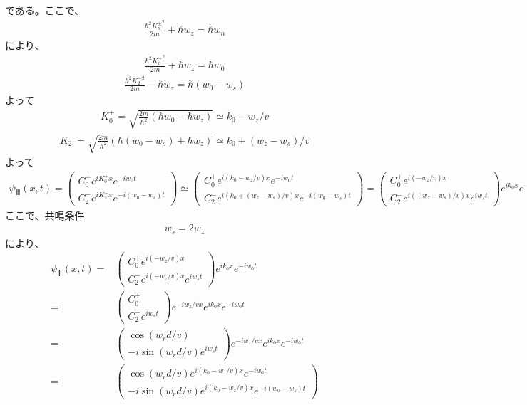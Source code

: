 である。ここで、
\begin{align}
\frac{{{\hbar}^2}{K_{n}^{\pm}}^2}{2m}{\pm}{\hbar}w_{z}={\hbar}w_{n}
\end{align}
により、
\begin{align}
\frac{{{\hbar}^2}{K_{0}^{+}}^2}{2m}+{\hbar}w_{z}={\hbar}w_{0}
\end{align}
\begin{align}
\frac{{{\hbar}^2}{K_{2}^{-}}^2}{2m}-{\hbar}w_{z}={\hbar}(w_{0}-w_{s})
\end{align}
よって
\begin{align}
K_{0}^{+}=\sqrt{\frac{2m}{{\hbar}^2}({\hbar}w_{0}-{\hbar}w_{z})}{\simeq}k_{0}-w_{z}/v
\end{align}
\begin{align}
K_{2}^{-}=\sqrt{\frac{2m}{{\hbar}^2}({\hbar}(w_{0}-w_{s})+{\hbar}w_{z})}{\simeq}k_{0}+(w_{z}-w_{s})/v
\end{align}
よって
\begin{align}
{\psi}_{Ⅲ}(x,t)=
\begin{pmatrix}
C_{0}^{+}e^{iK_{0}^{+}x}e^{-iw_{0}t} \\
C_{2}^{-}e^{iK_{2}^{-}x}e^{-i(w_{0}-w_{s})t}
\end{pmatrix}
{\simeq}
\begin{pmatrix}
C_{0}^{+}e^{i(k_{0}-w_{z}/v)x}e^{-iw_{0}t} \\
C_{2}^{-}e^{i(k_{0}+(w_{z}-w_{s})/v)x}e^{-i(w_{0}-w_{s})t}
\end{pmatrix}=
\begin{pmatrix}
C_{0}^{+}e^{i(-w_{z}/v)x} \\
C_{2}^{-}e^{i((w_{z}-w_{s})/v)x}e^{iw_{s}t}
\end{pmatrix}
e^{ik_{0}x}e^{-iw_{0}t}
\end{align}
ここで、共鳴条件
\begin{align}
w_{s}=2w_{z}
\end{align}
により、
\begin{align}
{\psi}_{Ⅲ}(x,t)=&
\begin{pmatrix}
C_{0}^{+}e^{i(-w_{z}/v)x} \\
C_{2}^{-}e^{i(-w_{z}/v)x}e^{iw_{s}t}
\end{pmatrix}
e^{ik_{0}x}e^{-iw_{0}t}\\
=&\begin{pmatrix}
C_{0}^{+} \\
C_{2}^{-}e^{iw_{s}t}
\end{pmatrix}
e^{-iw_{z}/vx}e^{ik_{0}x}e^{-iw_{0}t}\\
=&\begin{pmatrix}
\cos(w_{r}d/v) \\
-i\sin(w_{r}d/v)e^{iw_{s}t}
\end{pmatrix}
e^{-iw_{z}/vx}e^{ik_{0}x}e^{-iw_{0}t}\\
=&\begin{pmatrix}
\cos(w_{r}d/v)e^{i(k_{0}-w_{z}/v)x}e^{-iw_{0}t} \\
-i\sin(w_{r}d/v)e^{i(k_{0}-w_{z}/v)x}e^{-i(w_{0}-w_{s})t}
\end{pmatrix}
\end{align}
